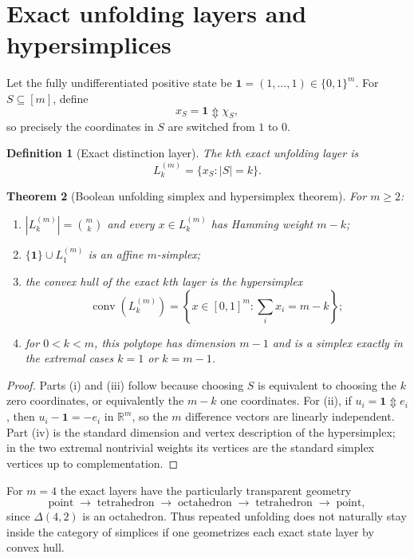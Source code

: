 \documentclass[11pt]{article}
\newtheorem{theorem}{Theorem}[section]
\newtheorem{definition}[theorem]{Definition}
\newcommand{\Updown}{\mathbin{\Updownarrow}}
\begin{document}
\section{Exact unfolding layers and hypersimplices}

Let the fully undifferentiated positive state be $\mathbf 1=(1,\dots,1)\in\{0,1\}^m$.  For $S\subseteq[m]$, define
\[
x_S=\mathbf 1\Updown \chi_S,
\]
so precisely the coordinates in $S$ are switched from $1$ to $0$.

\begin{definition}[Exact distinction layer]
The $k$th exact unfolding layer is
\[
L_k^{(m)}=\{x_S:|S|=k\}.
\]
\end{definition}

\begin{theorem}[Boolean unfolding simplex and hypersimplex theorem]\label{thm:hypersimplex}
For $m\ge2$:
\begin{enumerate}[label=(\roman*)]
\item $|L_k^{(m)}|=\binom{m}{k}$ and every $x\in L_k^{(m)}$ has Hamming weight $m-k$;
\item $\{\mathbf1\}\cup L_1^{(m)}$ is an affine $m$-simplex;
\item the convex hull of the exact $k$th layer is the hypersimplex
\[
\operatorname{conv}(L_k^{(m)})
=\left\{x\in[0,1]^m:\sum_i x_i=m-k\right\};
\]
\item for $0<k<m$, this polytope has dimension $m-1$ and is a simplex exactly in the extremal cases $k=1$ or $k=m-1$.
\end{enumerate}
\end{theorem}
\begin{proof}
Parts (i) and (iii) follow because choosing $S$ is equivalent to choosing the $k$ zero coordinates, or equivalently the $m-k$ one coordinates.  For (ii), if $u_i=\mathbf1\Updown e_i$, then $u_i-\mathbf1=-e_i$ in $\mathbb R^m$, so the $m$ difference vectors are linearly independent.  Part (iv) is the standard dimension and vertex description of the hypersimplex; in the two extremal nontrivial weights its vertices are the standard simplex vertices up to complementation.
\end{proof}

For $m=4$ the exact layers have the particularly transparent geometry
\[
\text{point}\;\longrightarrow\;\text{tetrahedron}\;\longrightarrow\;\text{octahedron}\;\longrightarrow\;\text{tetrahedron}\;\longrightarrow\;\text{point},
\]
since $\Delta(4,2)$ is an octahedron.  Thus repeated unfolding does not naturally stay inside the category of simplices if one geometrizes each exact state layer by convex hull.
\end{document}

